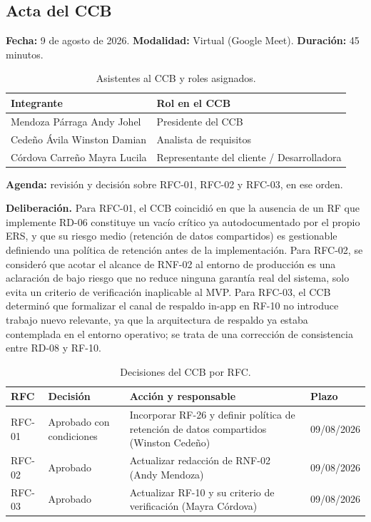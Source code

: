 \documentclass[journal,onecolumn]{IEEEtran}
\begin{document}
\subsection{Acta del CCB}

\textbf{Fecha:} 9 de agosto de 2026. \quad \textbf{Modalidad:} Virtual (Google Meet). \quad \textbf{Duración:} 45 minutos.

\begin{table}[H]
	\centering
	\small
	\begin{tabularx}{\textwidth}{@{}l l@{}}
		\toprule
		\textbf{Integrante} & \textbf{Rol en el CCB} \\
		\midrule
		Mendoza Párraga Andy Johel & Presidente del CCB \\
		Cedeño Ávila Winston Damian & Analista de requisitos \\
		Córdova Carreño Mayra Lucila & Representante del cliente / Desarrolladora \\
		\bottomrule
	\end{tabularx}
	\caption{Asistentes al CCB y roles asignados.}
	\label{tab:asistentes-ccb}
\end{table}

\textbf{Agenda:} revisión y decisión sobre RFC-01, RFC-02 y RFC-03, en ese orden.

\textbf{Deliberación.} Para RFC-01, el CCB coincidió en que la ausencia de un RF que implemente RD-06 constituye un vacío crítico ya autodocumentado por el propio ERS, y que su riesgo medio (retención de datos compartidos) es gestionable definiendo una política de retención antes de la implementación. Para RFC-02, se consideró que acotar el alcance de RNF-02 al entorno de producción es una aclaración de bajo riesgo que no reduce ninguna garantía real del sistema, solo evita un criterio de verificación inaplicable al MVP. Para RFC-03, el CCB determinó que formalizar el canal de respaldo in-app en RF-10 no introduce trabajo nuevo relevante, ya que la arquitectura de respaldo ya estaba contemplada en el entorno operativo; se trata de una corrección de consistencia entre RD-08 y RF-10.

\begin{table}[H]
	\centering
	\small
	\begin{tabularx}{\textwidth}{@{}l l X l@{}}
		\toprule
		\textbf{RFC} & \textbf{Decisión} & \textbf{Acción y responsable} & \textbf{Plazo} \\
		\midrule
		RFC-01 & Aprobado con condiciones & Incorporar RF-26 y definir política de retención de datos compartidos (Winston Cedeño) & 09/08/2026 \\
		RFC-02 & Aprobado & Actualizar redacción de RNF-02 (Andy Mendoza) & 09/08/2026 \\
		RFC-03 & Aprobado & Actualizar RF-10 y su criterio de verificación (Mayra Córdova) & 09/08/2026 \\
		\bottomrule
	\end{tabularx}
	\caption{Decisiones del CCB por RFC.}
	\label{tab:decisiones-ccb}
\end{table}
\end{document}
